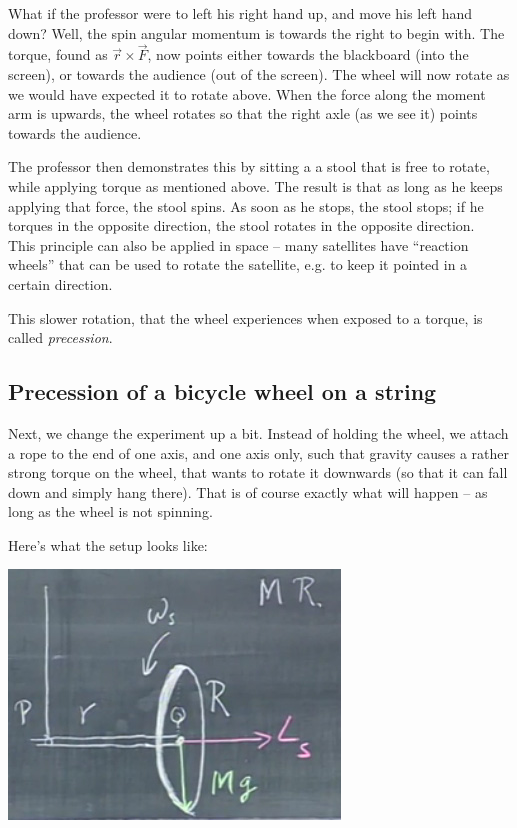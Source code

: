 \documentclass[8.01x]{subfiles}
\begin{document}
What if the professor were to left his right hand up, and move his left hand down? Well, the spin angular momentum is towards the right to begin with. The torque, found as $\vec{r} \times \vec{F}$, now points either towards the blackboard (into the screen), or towards the audience (out of the screen). The wheel will now rotate as we would have expected it to rotate above. When the force along the moment arm is upwards, the wheel rotates so that the right axle (as we see it) points towards the audience.

The professor then demonstrates this by sitting a a stool that is free to rotate, while applying torque as mentioned above. The result is that as long as he keeps applying that force, the stool spins. As soon as he stops, the stool stops; if he torques in the opposite direction, the stool rotates in the opposite direction.\\
This principle can also be applied in space -- many satellites have ``reaction wheels'' that can be used to rotate the satellite, e.g. to keep it pointed in a certain direction.

This slower rotation, that the wheel experiences when exposed to a torque, is called \emph{precession}.

\subsection{Precession of a bicycle wheel on a string}

Next, we change the experiment up a bit. Instead of holding the wheel, we attach a rope to the end of one axis, and one axis only, such that gravity causes a rather strong torque on the wheel, that wants to rotate it downwards (so that it can fall down and simply hang there). That is of course exactly what will happen -- as long as the wheel is not spinning.

Here's what the setup looks like:

\begin{center}
\includegraphics[scale=0.7]{Graphics/lec24_wheel_gravity}
\end{center}
\end{document}
